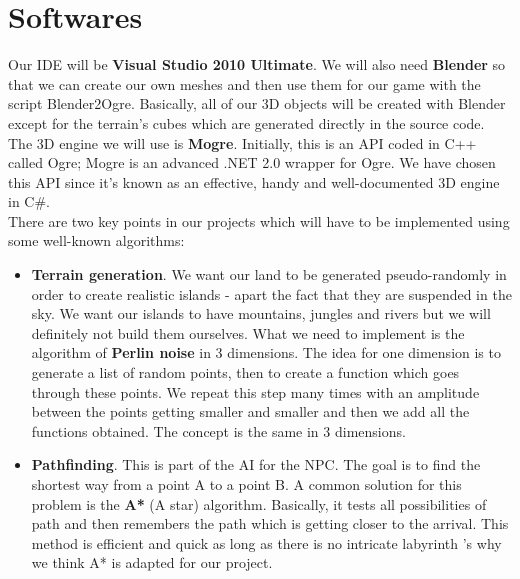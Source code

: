 \documentclass[article]{report} %
\renewcommand{\labelitemi}{$\bullet$}
\begin{document}
						\section{Softwares}
							Our \ac{IDE} will be \textbf{Visual Studio 2010 Ultimate}. We will also need \textbf{Blender} so that we can create our own meshes and then use them for our game with the script Blender2Ogre. Basically, all of our 3D objects will be created with Blender except for the terrain\textquoteright s cubes which are generated directly in the source code.
						The 3D engine we will use is \textbf{\ac{Mogre}}. Initially, this is an \ac{API} coded in C++ called Ogre; Mogre is an advanced .NET 2.0 wrapper for Ogre. We have chosen this \ac{API} since it\textquoteright s known as an effective, handy and well-documented 3D engine in C\#.\\		
							
							There are two key points in our projects which will have to be implemented using some well-known algorithms:
							\renewcommand{\labelitemi}{$\bullet$}
							\begin{itemize}
									\item \textbf{Terrain generation}. We want our land to be generated pseudo-randomly in order to create realistic islands - apart the fact that they are suspended in the sky. We want our islands to have mountains, jungles and rivers but we will definitely not build them ourselves. What we need to implement is the algorithm of \textbf{Perlin noise} in 3 dimensions. The idea for one dimension is to generate a list of random points, then to create a function which goes through these points. We repeat this step many times with an amplitude between the points getting smaller and smaller and then we add all the functions obtained. The concept is the same in 3 dimensions.\\

									\item \textbf{Pathfinding}. This is part of the \ac{AI} for the \ac{NPC}. The goal is to find the shortest way from a point A to a point B. A common solution for this problem is the \textbf{A*} (A star) algorithm. Basically, it tests all possibilities of path and then remembers the path which is getting closer to the arrival. This method is efficient and quick as long as there is no intricate labyrinth \textquoteright s why we think A* is adapted for our project.
							\end{itemize}

							\begin{acronym}
							\end{acronym}
     	     		
\end{document}
